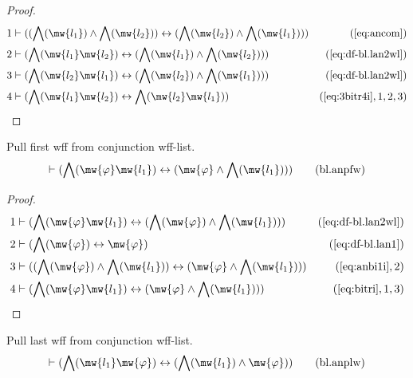 \begin{proof}
\begin{align}
  1 & \vdash ( ( \bigwedge( \mw{l_1} ) \wedge \bigwedge( \mw{l_2} ) )
    \leftrightarrow ( \bigwedge( \mw{l_2} ) \wedge
    \bigwedge( \mw{l_1} ) )
    )&(\mbox{\ref{eq:ancom}})\notag
  \\ 2 & \vdash ( \bigwedge( \mw{l_1} \mw{l_2} ) \leftrightarrow (
    \bigwedge( \mw{l_1} ) \wedge \bigwedge( \mw{l_2} ) )
    )&(\mbox{\ref{eq:df-bl.lan2wl}})\notag
  \\ 3 & \vdash ( \bigwedge( \mw{l_2} \mw{l_1} ) \leftrightarrow (
    \bigwedge( \mw{l_2} ) \wedge \bigwedge( \mw{l_1} ) )
    )&(\mbox{\ref{eq:df-bl.lan2wl}})\notag
  \\ 4 & \vdash ( \bigwedge( \mw{l_1} \mw{l_2} ) \leftrightarrow \bigwedge(
    \mw{l_2} \mw{l_1} )
    )&(\mbox{\ref{eq:3bitr4i}},1,2,3)\notag
\end{align}
\end{proof}

\begin{lemma} Pull first wff from conjunction wff-list.
\begin{align}
\vdash ( \bigwedge( \mw{\varphi} \mw{l_1} ) \leftrightarrow ( \mw{\varphi} \wedge
    \bigwedge( \mw{l_1} ) ) )\label{eq:bl.anpfw}\tag{bl.anpfw}
\end{align}
\end{lemma}

\begin{proof}
\begin{align}
  1 & \vdash ( \bigwedge( \mw{\varphi} \mw{l_1} ) \leftrightarrow ( \bigwedge(
    \mw{\varphi} ) \wedge \bigwedge( \mw{l_1} ) )
    )&(\mbox{\ref{eq:df-bl.lan2wl}})\notag
  \\ 2 & \vdash ( \bigwedge( \mw{\varphi} ) \leftrightarrow \mw{\varphi}
    )&(\mbox{\ref{eq:df-bl.lan1}})\notag
  \\ 3 & \vdash ( ( \bigwedge( \mw{\varphi} ) \wedge \bigwedge( \mw{l_1} ) )
    \leftrightarrow ( \mw{\varphi} \wedge \bigwedge( \mw{l_1}
    ) ) )&(\mbox{\ref{eq:anbi1i}},2)\notag
  \\ 4 & \vdash ( \bigwedge( \mw{\varphi} \mw{l_1} ) \leftrightarrow ( \mw{\varphi}
    \wedge \bigwedge( \mw{l_1} ) )
    )&(\mbox{\ref{eq:bitri}},1,3)\notag
\end{align}
\end{proof}

\begin{lemma} Pull last wff from conjunction wff-list.
\begin{align}
\vdash ( \bigwedge( \mw{l_1} \mw{\varphi} ) \leftrightarrow ( \bigwedge( \mw{l_1} )
    \wedge \mw{\varphi} ) )\label{eq:bl.anplw}\tag{bl.anplw}
\end{align}
\end{lemma}


